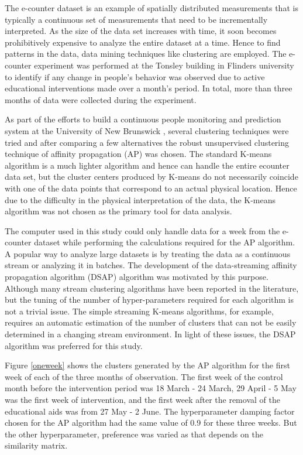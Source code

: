 The e-counter dataset is an example of spatially distributed measurements that is typically a continuous set of measurements that need to be incrementally interpreted. As the size of the data set increases with time, it soon becomes prohibitively expensive to analyze the entire dataset at a time. Hence to find patterns in the data, data mining techniques like clustering are employed. The e-counter experiment was performed at the Tonsley building in Flinders university to identify if any change in people's behavior was observed due to active educational interventions made over a month's period. In total, more than three months of data were collected during the experiment. 

As part of the efforts to build a continuous people monitoring and prediction system at the University of New Brunswick \citep{alec}, several clustering techniques were tried and after comparing a few alternatives the robust unsupervised clustering technique of affinity propagation (AP) was chosen. The standard K-means algorithm is a much lighter algorithm and hence can handle the entire ecounter data set, but the cluster centers produced by K-means do not necessarily coincide with one of the data points that correspond to an actual physical location. Hence due to the difficulty in the physical interpretation of the data, the K-means algorithm was not chosen as the primary tool for data analysis. 

The computer used in this study could only handle data for a week from the e-counter dataset while performing the calculations required for the AP algorithm.  A popular way to analyze large datasets is by treating the data as a continuous stream or analyzing it in batches. The development of the data-streaming affinity propagation algorithm (DSAP) algorithm was motivated by this purpose. Although many stream clustering algorithms have been reported in the literature, but the tuning of the number of hyper-parameters required for each algorithm is not a trivial issue. The simple streaming K-means algorithms, for example, requires an automatic estimation of the number of clusters that can not be easily determined in a changing stream environment. In light of these issues, the DSAP algorithm was preferred for this study. %
    
Figure \ref{oneweek} shows the clusters generated by the AP algorithm for the first week of each of the three months of observation. The first week of the control month before the intervention period was 18 March - 24 March, 29 April - 5 May was the first week of intervention, and the first week after the removal of the educational aids was from 27 May - 2 June. The hyperparameter damping factor chosen for the AP algorithm had the same value of 0.9 for these three weeks. But the other hyperparameter, preference was varied as that depends on the similarity matrix.

